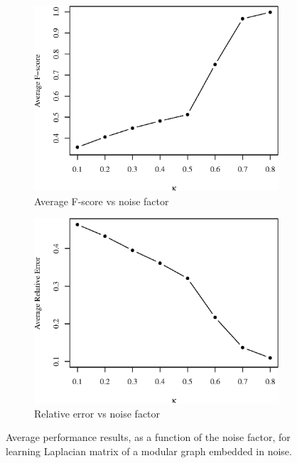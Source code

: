 \begin{figure}[!htb]
    \begin{subfigure}[b]{0.45\textwidth}
        \includegraphics[width=\textwidth]{block-diagonal/fscore.eps}
        \caption{Average F-score vs noise factor}
    \end{subfigure}
    \begin{subfigure}[b]{0.45\textwidth}
        \includegraphics[width=\textwidth]{block-diagonal/relative_error.eps}
        \caption{Relative error vs noise factor}
    \end{subfigure}
    \caption{Average performance results, as a function of the noise factor, for learning Laplacian matrix of a modular graph embedded in noise.}
    \label{fig:performance}
\end{figure}


